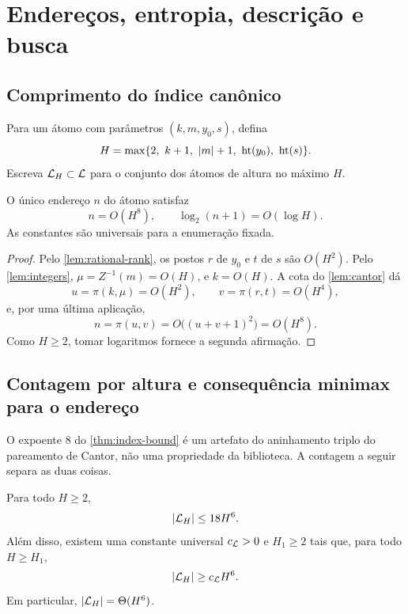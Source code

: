 \section{Endereços, entropia, descrição e busca}
\label{sec:complexity}

\subsection{Comprimento do índice canônico}

Para um átomo com parâmetros $(k,m,y_0,s)$, defina
\begin{equation}
 H=\max\{2,\ k+1,\ |m|+1,\ \height(y_0),\ \height(s)\}.
 \label{eq:atom-height}
\end{equation}
Escreva $\mathcal{L}_H\subset\mathcal{L}$ para o conjunto dos átomos de altura no máximo $H$.

\begin{theorem}\label{thm:index-bound}
O único endereço $n$ do átomo satisfaz
\begin{equation}
 n=O(H^8),\qquad \log_2(n+1)=O(\log H).
 \label{eq:index-bound}
\end{equation}
As constantes são universais para a enumeração fixada.
\end{theorem}

\begin{proof}
Pelo \cref{lem:rational-rank}, os postos $r$ de $y_0$ e $t$ de $s$ são $O(H^2)$. Pelo \cref{lem:integers}, $\mu=Z^{-1}(m)=O(H)$, e $k=O(H)$. A cota do \cref{lem:cantor} dá
\[
 u=\pi(k,\mu)=O(H^2),\qquad v=\pi(r,t)=O(H^4),
\]
e, por uma última aplicação,
\[
 n=\pi(u,v)=O\bigl((u+v+1)^2\bigr)=O(H^8).
\]
Como $H\ge2$, tomar logaritmos fornece a segunda afirmação.
\end{proof}

\subsection{Contagem por altura e consequência minimax para o endereço}

O expoente $8$ do \cref{thm:index-bound} é um artefato do aninhamento triplo do pareamento de Cantor, não uma propriedade da biblioteca. A contagem a seguir separa as duas coisas.

\begin{lemma}\label{lem:atom-count}
Para todo $H\ge2$,
\begin{equation}
 |\mathcal{L}_H|\le18H^6.
 \label{eq:atom-count-upper}
\end{equation}
Além disso, existem uma constante universal $c_{\mathcal{L}}>0$ e $H_1\ge2$ tais
que, para todo $H\ge H_1$,
\begin{equation}
 |\mathcal{L}_H|\ge c_{\mathcal{L}} H^6.
 \label{eq:atom-count}
\end{equation}
Em particular, $|\mathcal{L}_H|=\Theta(H^6)$.
\end{lemma}

